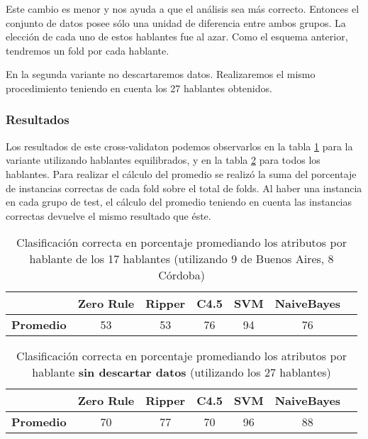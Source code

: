 Este cambio es menor y nos ayuda a que el análisis sea más correcto. Entonces el conjunto de datos posee sólo una unidad de diferencia entre ambos grupos. La elección de cada uno de estos hablantes fue al azar. Como el esquema anterior, tendremos un fold por cada hablante. 

En la segunda variante no descartaremos datos. Realizaremos el mismo procedimiento teniendo en cuenta los 27 hablantes obtenidos.

\subsubsection{Resultados}

Los resultados de este cross-validaton podemos observarlos en la tabla \ref{HPTDT_clas_xval_porHab} para la variante utilizando hablantes equilibrados, y en la tabla \ref{HPTDT_clas_xval_porHab_sindescartar} para todos los hablantes. Para realizar el cálculo del promedio se realizó la suma del porcentaje de instancias correctas de cada fold sobre el total de folds. Al haber una instancia en cada grupo de test, el cálculo del promedio teniendo en cuenta las instancias correctas devuelve el mismo resultado que éste.

{\small 	
	\begin{table}[H]
		\centering
		\begin{tabular}{|l|c|c|c|c|c|c|}
			\hline
			\textbf{}  & \textbf{Zero Rule} & \textbf{Ripper} & \textbf{C4.5} & \textbf{SVM} & \textbf{NaiveBayes} \\ \hline
			\textbf{Promedio} & 53  & 53 & 76 & 94 & 76 \\ \hline
		\end{tabular}
		\caption{Clasificación correcta en porcentaje promediando los atributos por hablante de los 17 hablantes (utilizando 9 de Buenos Aires, 8 Córdoba)}
		\label{HPTDT_clas_xval_porHab}
	\end{table}
}

{\small 	
	\begin{table}[H]
		\centering
		\begin{tabular}{|l|c|c|c|c|c|c|}
			\hline
			\textbf{}  & \textbf{Zero Rule} & \textbf{Ripper} & \textbf{C4.5} & \textbf{SVM} & \textbf{NaiveBayes} \\ \hline
			\textbf{Promedio} & 70  & 77 & 70 & 96 & 88 \\ \hline
		\end{tabular}
		\caption{Clasificación correcta en porcentaje promediando los atributos por hablante \textbf{sin descartar datos} (utilizando los 27 hablantes)}
		\label{HPTDT_clas_xval_porHab_sindescartar}
	\end{table}
}

